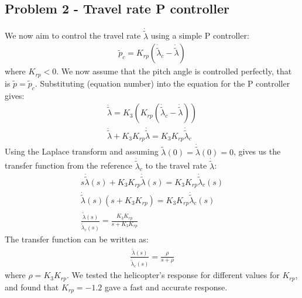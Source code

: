 \subsection{Problem 2 - Travel rate P controller}
We now aim to control the travel rate $\dot{\tilde{\lambda}}$ using a simple P controller:
\begin{gather*}
    \tilde{p}_c = K_{rp}(\dot{\tilde{\lambda}}_c - \dot{\tilde{\lambda}})
\end{gather*}
where $K_{rp} < 0$. We now assume that the pitch angle is controlled perfectly, that is $\tilde{p} = \tilde{p}_c$. Substituting (equation number) into the equation for the P controller gives:
\begin{gather*}
    \ddot{\tilde{\lambda}} = K_3(K_{rp}(\dot{\tilde{\lambda}}_c - \dot{\tilde{\lambda}})) \\ 
    \ddot{\tilde{\lambda}} + K_3K_{rp}\dot{\tilde{\lambda}} = K_3K_{rp}\dot{\tilde{\lambda}}_c
\end{gather*}
Using the Laplace transform and assuming  $\tilde{\lambda}(0) = \dot{\tilde{\lambda}}(0) = 0$, gives us the transfer function from the reference $\dot{\tilde{\lambda}}_c$ to the travel rate $\dot{\tilde{\lambda}}$:
\begin{gather*}
    s\dot{\tilde{\lambda}}(s) + K_3K_{rp}\dot{\tilde{\lambda}}(s) = K_3K_{rp}\dot{\tilde{\lambda}}_c(s) \\
    \dot{\tilde{\lambda}}(s)(s + K_3K_{rp}) = K_3K_{rp}\dot{\tilde{\lambda}}_c(s) \\
    \frac{\dot{\tilde{\lambda}}(s)}{\dot{\tilde{\lambda}}_c(s)} = \frac{K_3K_{rp}}{s + K_3K_{rp}}
\end{gather*}
The transfer function can be written as:
\begin{gather*}
    \frac{ \dot{\tilde{\lambda}}(s)}{\dot{\tilde{\lambda}}_c(s)} = \frac{\rho}{s + \rho}
\end{gather*}
where $\rho = K_3K_{rp}$. We tested the helicopter's response for different values for $K_{rp}$, and found that $K_{rp} = -1.2$ gave a fast and accurate response.  